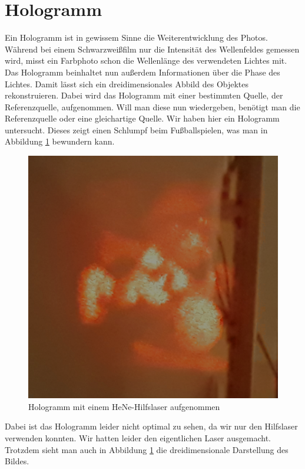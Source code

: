 \section{Hologramm}

Ein Hologramm ist in gewissem Sinne die Weiterentwicklung des Photos. Während bei einem Schwarzweißfilm nur die Intensität 
des Wellenfeldes gemessen wird, misst ein Farbphoto schon die Wellenlänge des verwendeten Lichtes mit. Das Hologramm 
beinhaltet nun außerdem Informationen über die Phase des Lichtes. Damit lässt sich ein dreidimensionales Abbild des 
Objektes rekonstruieren. Dabei wird das Hologramm mit einer bestimmten Quelle, der Referenzquelle, aufgenommen. Will man diese nun wiedergeben, benötigt man 
die Referenzquelle oder eine gleichartige Quelle. Wir haben hier ein Hologramm untersucht. Dieses zeigt einen Schlumpf 
beim Fußballspielen, was man in Abbildung \ref{bild:Holo} bewundern kann. 

\begin{figure}[ht]
    \centering
    \includegraphics[width = 12cm]{Bilder/Auswertung/Holo.png}
    \caption{Hologramm mit einem HeNe-Hilfslaser aufgenommen}
    \label{bild:Holo}
\end{figure}

Dabei ist das Hologramm leider nicht optimal zu sehen, da wir nur den Hilfslaser verwenden konnten. Wir hatten leider den eigentlichen Laser ausgemacht. Trotzdem sieht
man auch in Abbildung \ref{bild:Holo} die dreidimensionale Darstellung des Bildes.